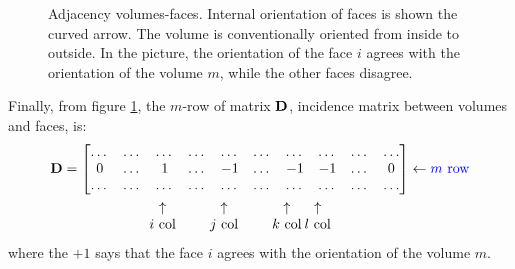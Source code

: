 \begin{figure}[htbp]
  \begin{center}
    \resizebox{4cm}{!}{}
  \end{center}
  \caption{Adjacency volumes-faces. Internal orientation of faces is
  shown the curved arrow. The volume is conventionally oriented from
  inside to outside. In the picture, the orientation of the face $i$
  agrees with the orientation of the volume $m$, while the other faces
  disagree.}
  \label{fig:adiacency_v_f}
\end{figure}

Finally, from figure \ref{fig:adiacency_v_f}, the $m$-row of matrix
$\mathbf{D}$, incidence matrix between volumes and faces, is:
\begin{align*}
  \Matrix{D} & = \begin{bmatrix}
    \dots & \dots & \dots  & \dots & \dots & \dots & \dots & \dots & \dots    & \dots \\
    0     & \dots & 1      & \dots & -1    & \dots & -1    & -1    & \dots    & 0     \\
    \dots & \dots & \dots  & \dots & \dots & \dots & \dots & \dots & \dots    & \dots
  \end{bmatrix} \leftarrow \text{\color[rgb]{0,0,1}$m$ row} \\
  & \quad \begin{matrix}
    \qquad & \qquad & \mspace{-14mu}\uparrow       & \qquad & \mspace{-28mu}\uparrow       & \qquad & \mspace{-28mu}\uparrow       & \mspace{-14mu}\uparrow \\
    \qquad & \qquad & \mspace{-14mu}\text{$i$ col} & \qquad & \mspace{-28mu}\text{$j$ col} & \qquad & \mspace{-28mu}\text{$k$ col} & \mspace{-14mu}\text{$l$ col}
  \end{matrix}
\end{align*}
where the $+1$ says that the face $i$ agrees with the orientation of
the volume $m$.

